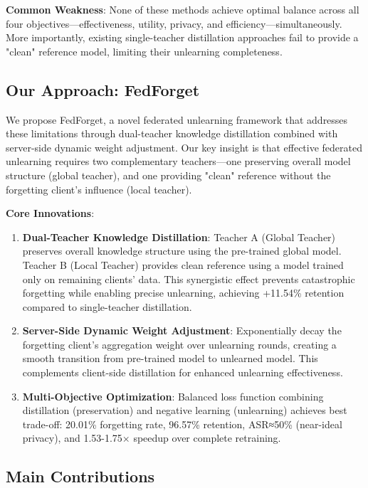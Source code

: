 \documentclass[11pt,a4paper]{article}
\begin{document}
\textbf{Common Weakness}: None of these methods achieve optimal balance across all four objectives—effectiveness, utility, privacy, and efficiency—simultaneously. More importantly, existing single-teacher distillation approaches fail to provide a "clean" reference model, limiting their unlearning completeness.

\subsection{Our Approach: FedForget}

We propose FedForget, a novel federated unlearning framework that addresses these limitations through dual-teacher knowledge distillation combined with server-side dynamic weight adjustment. Our key insight is that effective federated unlearning requires two complementary teachers—one preserving overall model structure (global teacher), and one providing "clean" reference without the forgetting client's influence (local teacher).

\textbf{Core Innovations}:

\begin{enumerate}
\item \textbf{Dual-Teacher Knowledge Distillation}: Teacher A (Global Teacher) preserves overall knowledge structure using the pre-trained global model. Teacher B (Local Teacher) provides clean reference using a model trained only on remaining clients' data. This synergistic effect prevents catastrophic forgetting while enabling precise unlearning, achieving +11.54\% retention compared to single-teacher distillation.

\item \textbf{Server-Side Dynamic Weight Adjustment}: Exponentially decay the forgetting client's aggregation weight over unlearning rounds, creating a smooth transition from pre-trained model to unlearned model. This complements client-side distillation for enhanced unlearning effectiveness.

\item \textbf{Multi-Objective Optimization}: Balanced loss function combining distillation (preservation) and negative learning (unlearning) achieves best trade-off: 20.01\% forgetting rate, 96.57\% retention, ASR≈50\% (near-ideal privacy), and 1.53-1.75× speedup over complete retraining.
\end{enumerate}

\subsection{Main Contributions}
\end{document}
